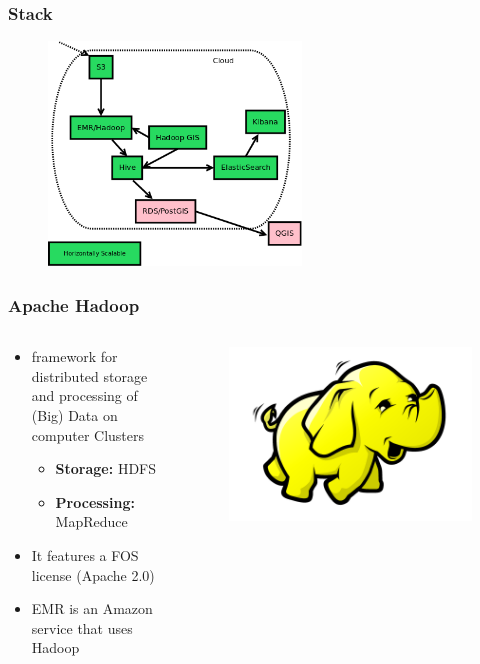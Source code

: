 \documentclass[hyperref={pdfpagelabels=true}]{beamer}
\begin{document}
\begin{frame}
\frametitle{Stack}
    \begin{figure}  
      \includegraphics[width=0.6\textwidth]{stack.png}
      \end{figure}  
\end{frame}

\begin{frame}
\frametitle{Apache Hadoop}
\begin{columns}
  \begin{column}{0.5\textwidth}
    \begin{itemize}
      \item<1->framework for distributed storage and processing of (Big) Data on computer Clusters
      \begin{itemize}
	\item<2->\textbf{Storage:} HDFS
	\item<2->\textbf{Processing:} MapReduce	
      \end{itemize}    
      \item<3->It features a FOS license (Apache 2.0)
      \item<4->EMR is an Amazon service that uses Hadoop
    \end{itemize}    
  \end{column}
  \begin{column}{0.5\textwidth}
      \begin{figure}  
	\includegraphics[width=\textwidth]{hadoop.png}
       \end{figure}  
  \end{column}  
\end{columns}
\end{frame}
\end{document}
